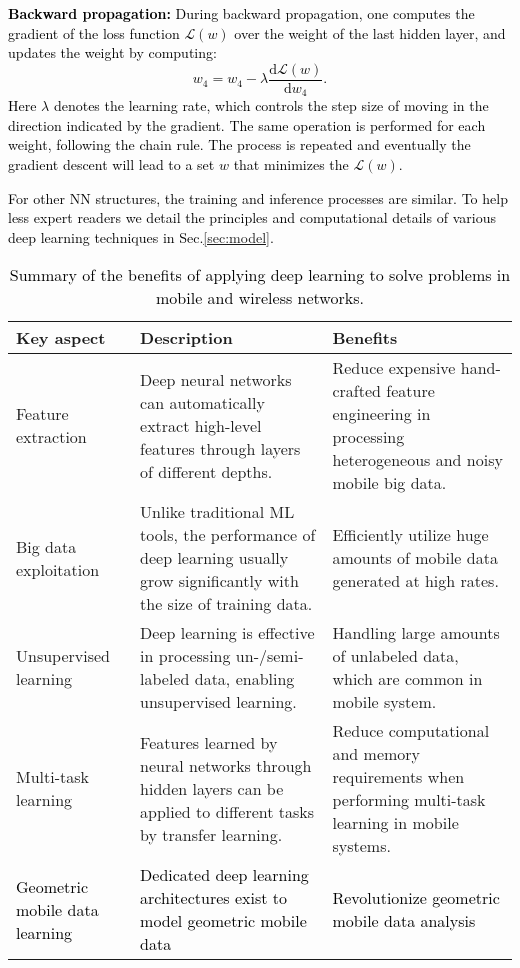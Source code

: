 \documentclass[journal,comsoc,letter]{IEEEtran}
\newcommand{\edit}[1]{\textcolor{black}{#1}}
\newcommand{\rev}[1]{\textcolor{black}{#1}}
\begin{document}
\noindent\edit{\textbf{Backward propagation:} During backward propagation, one computes the gradient of the loss function $\mathcal{L}(w)$ over the weight of the last hidden layer, and updates the weight by computing:
\begin{equation}
w_4 = w_4-\lambda\frac{\mathrm{d} \mathcal{L}(w)}{\mathrm{d} w_4}.
\end{equation}}
\noindent\edit{Here $\lambda$ denotes the learning rate, which controls the step size of moving in the direction indicated by the gradient. The same operation is performed for each weight, following the chain rule. The process is repeated and eventually the gradient descent will lead to a set $w$ that minimizes the $\mathcal{L}(w)$.}

\edit{For other NN structures, the training and inference processes are similar. To help less expert readers we detail the principles and computational details of various deep learning techniques in Sec.\ref{sec:model}.}

\begin{table}[ht]
\centering
\caption{\edit{Summary of the benefits of applying deep learning to solve problems in mobile and wireless networks.}}
\label{tab:advantage}
\color{black}
\begin{tabular}{|C{1.5cm}|C{3cm}|C{3cm}|}
\hline
\textbf{Key aspect}    & \textbf{Description}                                                                                                     & \textbf{Benefits}                                                                                         \\ \hline
Feature extraction    & Deep neural networks can automatically extract high-level features through layers of different depths.                    & Reduce expensive hand-crafted feature engineering in processing heterogeneous and noisy mobile big data. \\ \hline
Big data exploitation      & Unlike traditional ML tools, the performance of deep learning usually grow significantly with the size of training data. & Efficiently utilize huge amounts of mobile data generated at high rates.                          \\ \hline
Unsupervised learning & Deep learning is effective in processing un-/semi- labeled data, enabling unsupervised learning.    & Handling large amounts of unlabeled data, which are common in mobile system.                      \\ \hline
Multi-task learning   & Features learned by neural networks through hidden layers can be applied to different tasks by transfer learning.              & Reduce computational and memory requirements when performing multi-task learning in mobile systems.      \\ \hline
\rev{Geometric mobile data learning}   & \rev{Dedicated deep learning architectures exist to model geometric mobile data}              & \rev{Revolutionize geometric mobile data analysis}      \\ \hline
\end{tabular}
\end{table}
\end{document}
